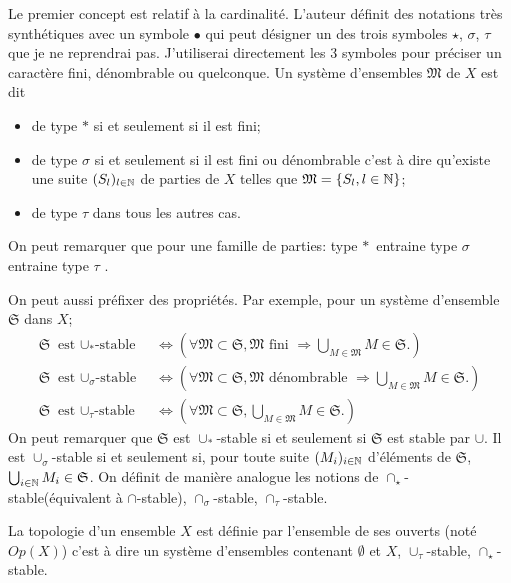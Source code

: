 Le premier concept est relatif à la cardinalité. L'auteur définit des notations très synthétiques avec un symbole $\bullet$ qui peut  désigner un des trois symboles $\star$, $\sigma$, $\tau$ que je ne reprendrai pas. J'utiliserai directement les 3 symboles pour préciser un caractère fini, dénombrable ou quelconque.\newline
Un système d'ensembles $\mathfrak{M}$ de $X$ est dit
\begin{itemize}
 \item de type $*$ si et seulement si il est fini;
 \item de type $\sigma$ si et seulement si il est fini ou dénombrable c'est à dire qu'existe une suite $(S_l)_{l\in \mathbb{N}}$ de parties de $X$ telles que $\mathfrak{M}= \left\lbrace S_l , l\in \mathbb{N} \right\rbrace$;
 \item de type $\tau$ dans tous les autres cas.
\end{itemize}
On peut remarquer que pour une famille de parties: \og type $*$\fg\, entraine \og type $\sigma$ \fg \, entraine \og type $\tau$ \fg.

On peut aussi préfixer des propriétés. Par exemple, pour un système d'ensemble $\mathfrak{S}$ dans $X$;
\begin{align*}
\mathfrak{S} \text{ est $\cup_*$-stable } &\Leftrightarrow \left( \forall \mathfrak{M} \subset \mathfrak{S}, \mathfrak{M} \text{ fini } \Rightarrow \bigcup_{M \in \mathfrak{M}}M \in \mathfrak{S}.\right) \\
\mathfrak{S} \text{ est $\cup_\sigma$-stable } &\Leftrightarrow \left( \forall \mathfrak{M} \subset \mathfrak{S}, \mathfrak{M} \text{ dénombrable } \Rightarrow \bigcup_{M \in \mathfrak{M}}M \in \mathfrak{S}.\right) \\
\mathfrak{S} \text{ est $\cup_\tau$-stable } &\Leftrightarrow \left( \forall \mathfrak{M} \subset \mathfrak{S}, \bigcup_{M \in \mathfrak{M}}M \in \mathfrak{S}.\right)
\end{align*}
On peut remarquer que $\mathfrak{S}$ est $\cup_*$-stable si et seulement si $\mathfrak{S}$ est stable par $\cup$. Il est $\cup_\sigma$-stable si et seulement si, pour toute suite $(M_i)_{i\in \mathbb{N}}$ d'éléments de $\mathfrak{S}$, $\bigcup_{i\in \mathbb{N}}M_i \in \mathfrak{S}$.\newline
On définit de manière analogue les notions de $\cap_\star$-stable(équivalent à $\cap$-stable), $\cap_\sigma$-stable, $\cap_\tau$-stable.
\begin{rem}
 La topologie d'un ensemble $X$ est définie par l'ensemble de ses ouverts (noté $Op(X)$) c'est à dire un système d'ensembles contenant $\emptyset$ et $X$, $\cup_\tau$-stable, $\cap_\star$-stable.
\end{rem}

